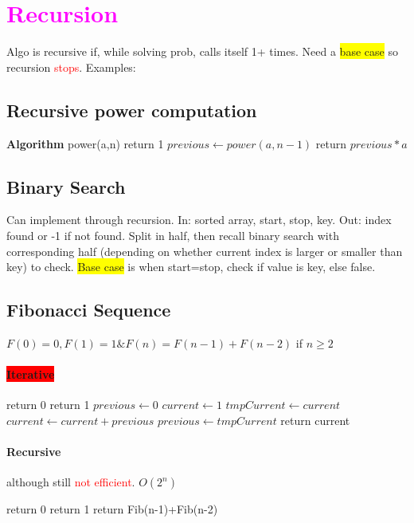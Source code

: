 \section{\textcolor{Fuchsia}{Recursion}}
Algo is recursive if, while solving prob, calls itself 1+ times. Need a \colorbox{Yellow}{base case} so recursion \textcolor{Red}{stops}. Examples:
\subsection{Recursive power computation}
\begin{algorithmic}
	\State \textbf{Algorithm} power(a,n)
	 return 1
	\Else 
		\State $previous \gets power(a,n-1)$
		\State return $previous*a$
	\EndIf
\end{algorithmic}
\subsection{Binary Search} Can implement through recursion. In: sorted array, start, stop, key. Out: index found or -1 if not found. Split in half, then recall binary search with corresponding half (depending on whether current index is larger or smaller than key) to check. \colorbox{Yellow}{Base case} is when start=stop, check if value is key, else false.
\subsection{Fibonacci Sequence} $F(0)=0, F(1)=1 \& F(n)=F(n-1)+F(n-2)$ if $n\geq 2$
\vspace{-7 pt}
\paragraph{\colorbox{Red}{Iterative}}
\begin{algorithmic}
	 return 0
	\EndIf
	 return 1
	\EndIf
	\State $previous \gets 0$
	\State $current \gets 1$
		\State $tmpCurrent \gets current$
		\State $current \gets current+previous$
		\State $previous \gets tmpCurrent$
	\EndFor
	\State return current
\end{algorithmic}
\vspace{-7 pt}
\paragraph{Recursive} although still \textcolor{Red}{not efficient}.
$O(2^n)$
\begin{algorithmic}
	 return 0
	 return 1
	\Else return Fib(n-1)+Fib(n-2)
	\EndIf
\end{algorithmic}
\color {CarnationPink}
